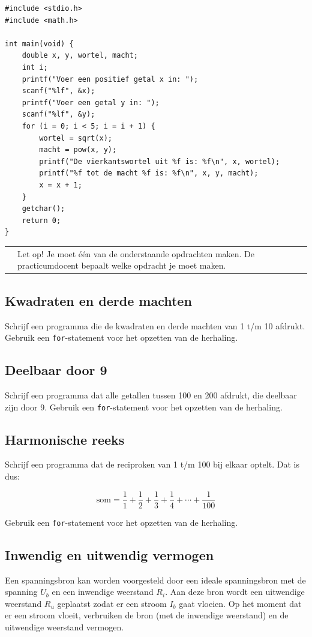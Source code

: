 \documentclass[a4paper,10pt,fleqn,twoside]{article}
\newcommand{\letop}{%
\vspace*{2ex}
\begin{mdframed}[outerlinewidth = 1 ,%
roundcorner = 4 pt,%
leftmargin = 40,%
rightmargin = 40,%
backgroundcolor = yellow!40,%
outerlinecolor = red!70!black,%
innertopmargin = \topskip,%
splittopskip = \topskip,%
]
\begin{tabularx}{\linewidth}{m{1cm}X}
\Large\leftpointright & Let op! Je moet één van de onderstaande opdrachten maken. De practicumdocent bepaalt welke opdracht je moet maken.
\end{tabularx}
\end{mdframed}
}
\begin{document}
\begin{lstlisting}
#include <stdio.h>
#include <math.h>

int main(void) {
    double x, y, wortel, macht;
    int i;
    printf("Voer een positief getal x in: ");
    scanf("%lf", &x);
    printf("Voer een getal y in: ");
    scanf("%lf", &y);
    for (i = 0; i < 5; i = i + 1) {
        wortel = sqrt(x);
        macht = pow(x, y);
        printf("De vierkantswortel uit %f is: %f\n", x, wortel);
        printf("%f tot de macht %f is: %f\n", x, y, macht);
        x = x + 1;
    }
    getchar();
    return 0;
}
\end{lstlisting}

\letop

\subsection{Kwadraten en derde machten}
Schrijf een programma die de kwadraten en derde machten van 1 t/m 10 afdrukt. Gebruik een \lstinline|for|-statement voor het opzetten van de herhaling.

\subsection{Deelbaar door 9}
Schrijf een programma dat alle getallen tussen 100 en 200 afdrukt, die deelbaar zijn door 9. Gebruik een \lstinline|for|-statement voor het opzetten van de herhaling.

\subsection{Harmonische reeks}
Schrijf een programma dat de reciproken van 1 t/m 100 bij elkaar optelt. Dat is dus:

\begin{equation*}
\text{som} = \dfrac{1}{1}+\dfrac{1}{2}+\dfrac{1}{3}+\dfrac{1}{4} + \cdots + \dfrac{1}{100}
\end{equation*}

Gebruik een \lstinline|for|-statement voor het opzetten van de herhaling.
 
\subsection{Inwendig en uitwendig vermogen}
Een spanningsbron kan worden voorgesteld door een ideale spanningsbron met de spanning $U_b$ en een inwendige weerstand $R_i$. Aan deze bron wordt een uitwendige weerstand $R_u$ geplaatst zodat er een stroom $I_b$ gaat vloeien. Op het moment dat er een stroom vloeit, verbruiken de bron (met de inwendige weerstand) en de uitwendige weerstand vermogen.
\end{document}
